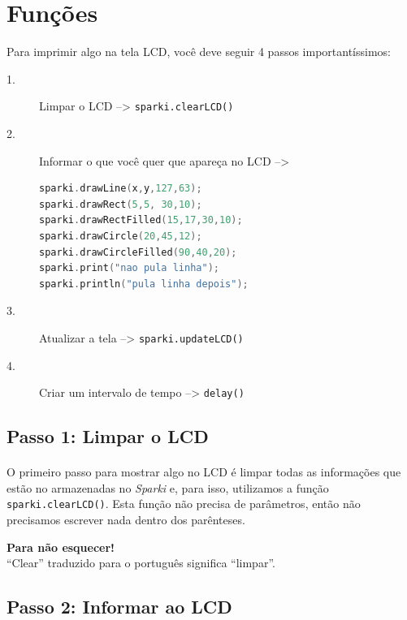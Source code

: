 \section{Funções}

Para imprimir algo na tela LCD, você deve seguir 4 passos importantíssimos:
\begin{description}
\item[1.] Limpar o LCD --> \lstinline[columns=fixed]{sparki.clearLCD()}
\item[2.] Informar o que você quer que apareça no LCD -->
\begin{lstlisting}[language=C]
sparki.drawLine(x,y,127,63);
sparki.drawRect(5,5, 30,10); 
sparki.drawRectFilled(15,17,30,10); 
sparki.drawCircle(20,45,12); 
sparki.drawCircleFilled(90,40,20); 
sparki.print("nao pula linha"); 
sparki.println("pula linha depois");
\end{lstlisting}

\item[3.] Atualizar a tela --> \lstinline[columns=fixed]{sparki.updateLCD()}
\item[4.] Criar um intervalo de tempo --> \lstinline[columns=fixed]{delay()}
\end{description}

\subsection{Passo 1: Limpar o LCD}

\paragraph{}
O primeiro passo para mostrar algo no LCD é limpar todas as informações que estão no armazenadas no \textit{Sparki} e, para isso, utilizamos a função \lstinline[columns=fixed]{sparki.clearLCD()}. Esta função não precisa de parâmetros, então não precisamos escrever nada dentro dos parênteses.

\begin{center}
    \textcolor{mydarkblue}{\textbf{Para não esquecer!}} 
    \\ ``Clear'' traduzido para o português significa ``limpar''.
\end{center}

\subsection{Passo 2: Informar ao LCD}

